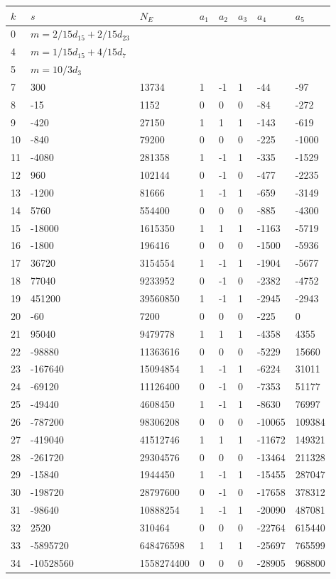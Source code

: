 \documentclass{amsart}
\begin{document}
\begin{longtable}{|l|l|l|lllll|}
\hline
$k$ & $s$ & $N_E$ & $a_1$ & $a_2$ & $a_3$ & $a_4$ & $a_5$\\
\hline
0&$m=2/15d_{15}+2/15d_{23}$&&\multicolumn{5}{c|}{}\\
4&$m=1/15d_{15}+4/15d_{7}$&&\multicolumn{5}{c|}{}\\
5&$m=10/3d_{3}$&&\multicolumn{5}{c|}{}\\
7&300&13734&1&-1&1&-44&-97\\
8&-15&1152&0&0&0&-84&-272\\
9&-420&27150&1&1&1&-143&-619\\
10&-840&79200&0&0&0&-225&-1000\\
11&-4080&281358&1&-1&1&-335&-1529\\
12&960&102144&0&-1&0&-477&-2235\\
13&-1200&81666&1&-1&1&-659&-3149\\
14&5760&554400&0&0&0&-885&-4300\\
15&-18000&1615350&1&1&1&-1163&-5719\\
16&-1800&196416&0&0&0&-1500&-5936\\
17&36720&3154554&1&-1&1&-1904&-5677\\
18&77040&9233952&0&-1&0&-2382&-4752\\
19&451200&39560850&1&-1&1&-2945&-2943\\
20&-60&7200&0&0&0&-225&0\\
21&95040&9479778&1&1&1&-4358&4355\\
22&-98880&11363616&0&0&0&-5229&15660\\
23&-167640&15094854&1&-1&1&-6224&31011\\
24&-69120&11126400&0&-1&0&-7353&51177\\
25&-49440&4608450&1&-1&1&-8630&76997\\
26&-787200&98306208&0&0&0&-10065&109384\\
27&-419040&41512746&1&1&1&-11672&149321\\
28&-261720&29304576&0&0&0&-13464&211328\\
29&-15840&1944450&1&-1&1&-15455&287047\\
30&-198720&28797600&0&-1&0&-17658&378312\\
31&-98640&10888254&1&-1&1&-20090&487081\\
32&2520&310464&0&0&0&-22764&615440\\
33&-5895720&648476598&1&1&1&-25697&765599\\
34&-10528560&1558274400&0&0&0&-28905&968800\\

\end{longtable}
\end{document}

